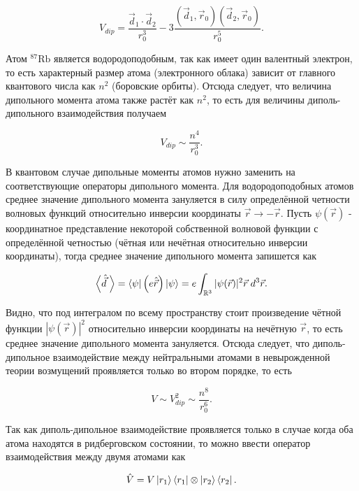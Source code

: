 \begin{equation}
	V_{dip} = \frac{\vec{d}_1 \cdot \vec{d}_2}{r_0^3} - 3\frac{\left(\vec{d}_1, \vec{r}_0\right)\left(\vec{d}_2, \vec{r}_0\right)}{r_0^5}.
\end{equation}

Атом $^{87}\text{Rb}$ является водородоподобным, так как имеет один валентный электрон, то есть характерный размер атома (электронного облака) зависит от главного квантового числа как $n^2$ (боровские орбиты). Отсюда следует, что величина дипольного момента атома также растёт как $n^2$, то есть для величины диполь-дипольного взаимодействия получаем 

\begin{equation}
	V_{dip} \sim \frac{n^4}{r_0^3}. 
\end{equation}

В квантовом случае дипольные моменты атомов нужно заменить на соответствующие операторы дипольного момента. Для водородоподобных атомов среднее значение дипольного момента зануляется в силу определённой четности волновых функций \cite{Belousov} относительно инверсии координаты $\vec{r} \rightarrow -\vec{r}$. Пусть $\psi(\vec{r})$ - координатное представление некоторой собственной волновой функции с определённой четностью (чётная или нечётная относительно инверсии координаты), тогда среднее значение дипольного момента запишется как

\begin{equation}
	\left< \hat{\vec{d}}\;\right> = \left\langle \psi \right|\left( e \hat{\vec{r}}\right)\left| \psi \right\rangle = e\int_{\mathbb{R}^3}|\psi(\vec{r})|^2\vec{r} \; d^3\vec{r}.
\end{equation}

Видно, что под интегралом по всему пространству стоит произведение чётной функции $|\psi(\vec{r})|^2$ относительно инверсии координаты на нечётную $\vec{r}$, то есть среднее значение дипольного момента зануляется. Отсюда следует, что диполь-дипольное взаимодействие между нейтральными атомами в невырожденной теории возмущений проявляется только во втором порядке, то есть 

\begin{equation}
	V \sim V_{dip}^2 \sim \frac{n^8}{r_0^6}.
\end{equation}

Так как диполь-дипольное взаимодействие проявляется только в случае когда оба атома находятся в ридберговском состоянии, то можно ввести оператор взаимодействия между двумя атомами как 

\begin{equation}
	\hat{V} = V \left| r_1 \right\rangle\left\langle r_1 \right|\otimes \left| r_2 \right\rangle\left\langle r_2 \right|.
\end{equation}

